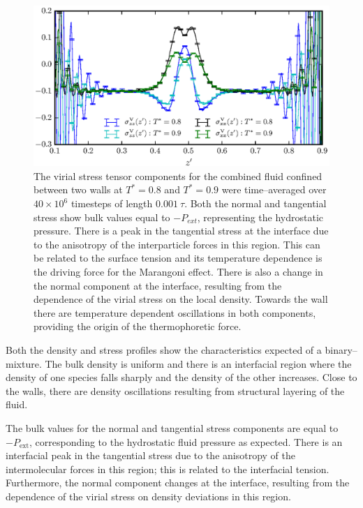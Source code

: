 \begin{figure}[h!]
\centering
\includegraphics[scale=1.0]{PisVirStress}
\caption{The virial stress tensor components for the combined fluid confined between two walls at $T^{*} = 0.8$ and $T^{*} = 0.9$ were time--averaged over $40 \times 10^{6}$ timesteps of length $0.001\ \tau$.
Both the normal and tangential stress show bulk values equal to $-P_{ext}$, representing the hydrostatic pressure.
There is a peak in the tangential stress at the interface due to the anisotropy of the interparticle forces in this region.
This can be related to the surface tension and its temperature dependence is the driving force for the Marangoni effect.
There is also a change in the normal component at the interface, resulting from the dependence of the virial stress on the local density.
Towards the wall there are temperature dependent oscillations in both components, providing the origin of the thermophoretic force.
}
\label{PisVirStress}
\end{figure}

Both the density and stress profiles show the characteristics expected of a binary--mixture. 
The bulk density is uniform and there is an interfacial region where the density of one species falls sharply and the density of the other increases.
Close to the walls, there are density oscillations resulting from structural layering of the fluid.

The bulk values for the normal and tangential stress components are equal to $-P_{\mathrm{ext}}$, corresponding to the hydrostatic fluid pressure as expected.
There is an interfacial peak in the tangential stress due to the anisotropy of the intermolecular forces in this region; this is related to the interfacial tension.\cite{Marchand2011}
Furthermore, the normal component changes at the interface, resulting from the dependence of the virial stress on density deviations in this region.

